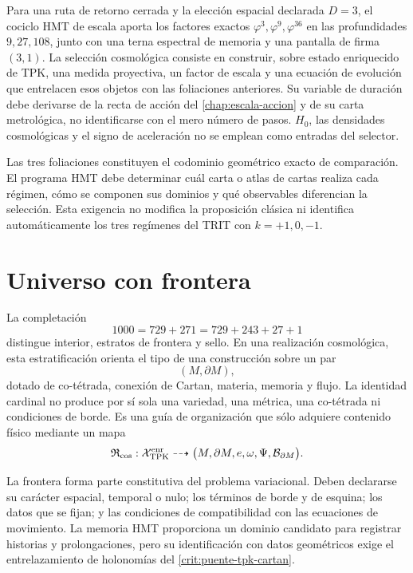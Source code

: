 \begin{statusbox}
    Para una ruta de retorno cerrada y la elección espacial declarada
    \(D=3\), el cociclo HMT de escala aporta los factores exactos
    \(\varphi^3,\varphi^9,\varphi^{36}\) en las profundidades
    \(9,27,108\), junto con una terna espectral de memoria y una pantalla de
    firma \((3,1)\). La selección cosmológica consiste en construir, sobre
    estado enriquecido de TPK, una medida proyectiva, un factor de escala y una ecuación de
    evolución que entrelacen esos objetos con las foliaciones anteriores. Su
    variable de duración debe derivarse de la recta de acción del
    \cref{chap:escala-accion} y de su carta metrológica, no identificarse con
    el mero número de pasos. \(H_0\), las densidades cosmológicas y el signo
    de aceleración no se emplean como entradas del selector.
\end{statusbox}

Las tres foliaciones constituyen el codominio geométrico exacto de
comparación. El programa HMT debe determinar cuál carta o atlas de cartas
realiza cada régimen, cómo se componen sus dominios y qué observables
diferencian la selección. Esta exigencia no modifica la proposición clásica
ni identifica automáticamente los tres regímenes del TRIT con
\(k=+1,0,-1\).

\section{Universo con frontera}
\label{sec:universo-con-frontera-hmt}

La completación
\[
 1000=729+271=729+243+27+1
\]
distingue interior, estratos de frontera y sello. En una realización
cosmológica, esta estratificación orienta el tipo de una construcción sobre
un par
\[
 (M,\partial M),
\]
dotado de co-tétrada, conexión de Cartan, materia, memoria y flujo. La
identidad cardinal no produce por sí sola una variedad, una métrica, una
co-tétrada ni condiciones de borde. Es una guía de organización que sólo
adquiere contenido físico mediante un mapa
\[
 \mathfrak R_{\rm cos}:
 \mathcal X_{\rm TPK}^{\rm enr}
 \dashrightarrow
 \bigl(M,\partial M,e,\omega,\Psi,\mathcal B_{\partial M}\bigr).
\]

La frontera forma parte constitutiva del problema variacional. Deben
declararse su carácter espacial, temporal o nulo; los términos de borde y de
esquina; los datos que se fijan; y las condiciones de compatibilidad con las
ecuaciones de movimiento. La memoria HMT proporciona un dominio candidato
para registrar historias y prolongaciones, pero su identificación con datos
geométricos exige el entrelazamiento de holonomías del
\cref{crit:puente-tpk-cartan}.

